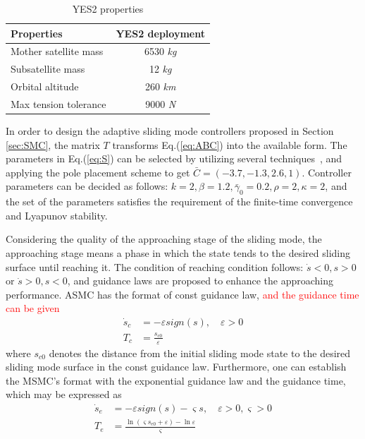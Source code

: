 \documentclass[3p]{elsarticle}
\theoremstyle{plain}
\begin{document}
\begin{table}[h]
\begin{center}
\caption{YES2 properties}\label{ta:properites}
\begin{tabular}{lc}
\toprule
Properties              &YES2 deployment\\
\midrule
Mother satellite mass   &6530 \textit{kg}\\
Subsatellite mass       &12 \textit{kg}\\
Orbital altitude        &260 \textit{km}\\
Max tension tolerance   &9000 \textit{N}\\
\bottomrule
\end{tabular}
\end{center}
\end{table}
In order to design the adaptive sliding mode controllers proposed in Section {\ref{sec:SMC}}, the matrix $T$ transforms Eq.(\ref{eq:ABC}) into the available form. The parameters in Eq.(\ref{eq:S}) can be selected by utilizing several techniques~\cite{Aggoune1994Design,Lin1993A}, and applying the pole placement scheme to get $\bar{C} = (-3.7,-1.3 ,2.6,1)$. Controller parameters can be decided as follows: $k = 2,\beta = 1.2,\bar{\gamma}_0=0.2,\rho = 2,\kappa=2$, and the set of the parameters satisfies the requirement of the finite-time convergence and Lyapunov stability.\par
Considering the quality of the approaching stage of the sliding mode, the approaching stage means a phase in which the state tends to the desired sliding surface until reaching it. The condition of reaching condition follows: $\dot{s}<0,s>0$ or $\dot{s}>0,s<0$, and guidance laws are proposed to enhance the approaching performance. ASMC has the format of const guidance law, \textcolor{red}{and the guidance time can be given}
\begin{align}
\dot{s}_c &= -\varepsilon sign(s),\quad \varepsilon>0\label{eq:sc}\\
T_c &= \frac{s_{c0}}{\varepsilon}
\end{align}
where $s_{c0}$ denotes the distance from the initial sliding mode state to the desired sliding mode surface in the const guidance law. Furthermore, one can establish the MSMC's format with the exponential guidance law and the guidance time, which may be expressed as
\begin{align}
\dot{s}_e &= -\varepsilon sign(s)-\varsigma s,\quad \varepsilon>0,\varsigma>0\\
T_e &= \frac{\ln (\varsigma s_{e0}+\varepsilon)-\ln\varepsilon}{\varsigma}
\end{align}
\end{document}
